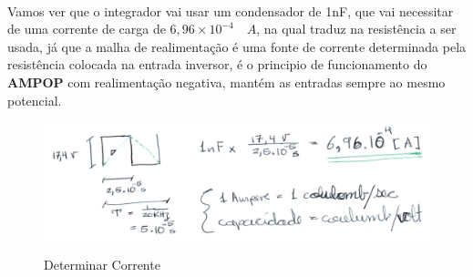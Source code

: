 \\
Vamos ver que o integrador vai usar um condensador de 1nF, que vai necessitar de uma corrente de carga de $6,96 \times 10^{-4} \quad A$, na qual traduz na resistência a ser usada, já que a malha de realimentação é uma fonte de corrente determinada pela resistência colocada na entrada inversor, é o principio de funcionamento do {\bf AMPOP} com realimentação negativa, mantém as entradas sempre ao mesmo potencial.
\begin{figure}[H]
	\includegraphics[scale=0.9]{./image/trb3calc_1.jpg}\\
	\caption{Determinar Corrente}
\end{figure}
